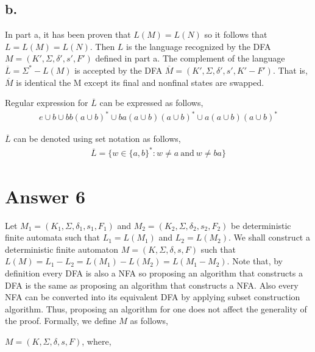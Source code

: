 \documentclass[12pt]{article}
\begin{document}
\subsection*{b.}
In part a, it has been proven that $L(M) = L(N)$ so it follows that $L = L(M) = L(N)$. Then $L$ is the language recognized by the DFA $M = (K', \Sigma, \delta', s', F')$ defined in part a. The complement of the language $\overline{L} = \Sigma^* - L(M)$ is accepted by the DFA $\overline{M} = (K', \Sigma, \delta', s', K' - F')$. That is, $\overline{M}$ is identical the M except its final and nonfinal states are swapped.

Regular expression for $\overline{L}$ can be expressed as follows,
\begin{equation*}
    \begin{split}
         e \cup b \cup bb(a \cup b)^* \cup ba(a \cup b)(a \cup b)^* \cup a(a \cup b)(a \cup b)^*
    \end{split}
\end{equation*}

$\overline{L}$ can be denoted using set notation as follows,
\begin{equation*}
    \begin{split}
         \overline{L} = \{w \in \{a, b\}^* : w \neq a \ \text{and} \ w \neq ba\}
    \end{split}
\end{equation*}



\section*{Answer 6}
Let $M_1 = (K_1, \Sigma, \delta_1, s_1, F_1)$ and $M_2 = (K_2, \Sigma, \delta_2, s_2, F_2)$ be deterministic finite automata such that $L_1 = L(M_1)$ and $L_2 = L(M_2)$. We shall construct a deterministic finite automaton $M = (K, \Sigma, \delta, s, F)$ such that $L(M) = L_1 - L_2 = L(M_1) - L(M_2) = L(M_1 - M_2)$. Note that, by definition every DFA is also a NFA so proposing an algorithm that constructs a DFA is the same as proposing an algorithm that constructs a NFA. Also every NFA can be converted into its equivalent DFA by applying subset construction algorithm. Thus, proposing an algorithm for one does not affect the generality of the proof. Formally, we define $M$ as follows,

$M = (K, \Sigma, \delta, s, F)$, where,
\end{document}

